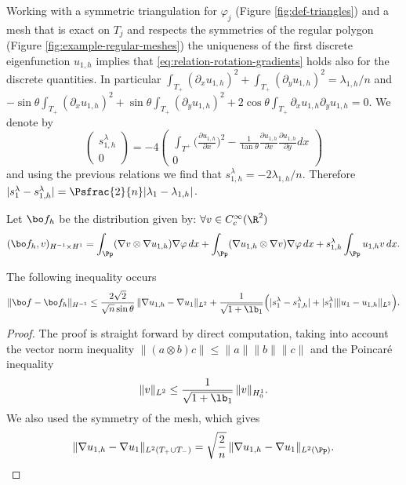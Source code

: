 Working with a symmetric triangulation for $\varphi_j$ (Figure \ref{fig:def-triangles}) and a mesh that is exact on $T_j$ and respects the symmetries of the regular polygon (Figure \ref{fig:example-regular-meshes}) the uniqueness of the first discrete eigenfunction $u_{1,h}$ implies that \eqref{eq:relation-rotation-gradients} holds also for the discrete quantities. In particular $\int_{T_+}(\partial_x u_{1,h})^2+\int_{T_+}(\partial_y u_{1,h})^2 = \lambda_{1,h}/n$ and $-\sin\theta \int_{T_+}(\partial_x u_{1,h})^2+\sin \theta \int_{T_+}(\partial_y u_{1,h})^2+2\cos\theta \int_{T_+}\partial_x u_{1,h}\partial_y u_{1,h} = 0$.
We denote by
\[
\begin{pmatrix}s_{1,h}^\lambda \\ 0\end{pmatrix} = -4 \begin{pmatrix} \displaystyle \int_{T^+ }\Big (\frac{\partial u_{1,h}}{\partial x} \Big)^2 - \frac{1}{\tan \theta} \frac{\partial u_{1,h} }{\partial x} \frac{\partial u_{1,h}}{\partial y}dx\\0 \end{pmatrix}
\]
and using the previous relations we find that $s_{1,h}^\lambda = -2\lambda_{1,h}/n$. Therefore $|s_1^\lambda-s_{1,h}^\lambda|=\Psfrac{2}{n}|\lambda_1-\lambda_{1,h}|$.

Let
$\bo f_h$ be the distribution given by: $\forall v \in C_c^\infty (\R^2)$
\[
(\bo f_h,v)_{H^{-1}\times H^1} = \int_{\Pp}(\nabla v \otimes \nabla u_{1,h})\nabla \varphi \notag \, dx + \int_{\Pp}(\nabla u_{1,h} \otimes \nabla v)\nabla \varphi \notag \, dx+s_{1,h}^\lambda \int_{\Pp} u_{1,h}v\, dx.
\]

\begin{propo}
The following inequality occurs
\[
\|\bo f-\bo f_h\|_{H^{-1}} \le \frac{2 \sqrt{2}}{\sqrt{n} \sin \theta }\,\|\nabla u_{1,h}-\nabla u_1\|_{L^2} + \frac{1}{\sqrt{1+\lb_1}}\Big (|s_1^\lambda- s_{1,h}^\lambda |+|s_1^\lambda| \|u_1-u_{1,h}\|_{L^2}\Big).
\]
\end{propo}

\begin{proof}
The proof is straight forward by direct computation, taking into account the vector norm inequality $\|(a\otimes b)c\|\le \|a\| \|b \| \|c\|$ and the Poincaré inequality
\[
\|v\|_{L^2} \le \frac{1}{\sqrt{1+ \lb_1}}\, \|v\|_{H^1_0}.
\]
We also used the symmetry of the mesh, which gives
\[
\|\nabla u_{1,h}-\nabla u_1\|_{L^2(T_+\cup T_-)}= \sqrt{\frac 2n}\, \|\nabla u_{1,h}-\nabla u_1\|_{L^2(\Pp)}.\qedhere
\]
\end{proof}

